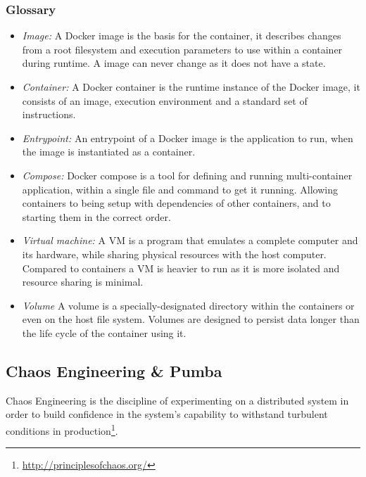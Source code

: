 \subsubsection{Glossary}
\begin{itemize}
    \item \textit{Image:} 
    A Docker image is the basis for the container, it describes changes from a root filesystem and execution parameters to use within a container during runtime. A image can never change as it does not have a state.
    
    \item \textit{Container:}
    A Docker container is the runtime instance of the Docker image, it consists of an image, execution environment and a standard set of instructions.
    
    \item \textit{Entrypoint:}
    An entrypoint of a Docker image is the application to run, when the image is instantiated as a container.
    
    \item \textit{Compose:}
    Docker compose is a tool for defining and running multi-container application, within a single file and command to get it running. Allowing containers to being setup with dependencies of other containers, and to starting them in the correct order.
    
    \item \textit{Virtual machine:}
    A \acl{VM} is a program that emulates a complete computer and its hardware, while sharing physical resources with the host computer. Compared to containers a \ac{VM} is heavier to run as it is more isolated and resource sharing is minimal.
    
    \item \textit{Volume}
    A volume is a specially-designated directory within the containers or even on the host file system. Volumes are designed to persist data longer than the life cycle of the container using it.

\end{itemize}


\subsection{Chaos Engineering \& Pumba}
\label{sec:framework_pumba}
Chaos Engineering is the discipline of experimenting on a distributed system in order to build confidence in the system’s capability to withstand turbulent conditions in production\footnote{\url{http://principlesofchaos.org/}}.

